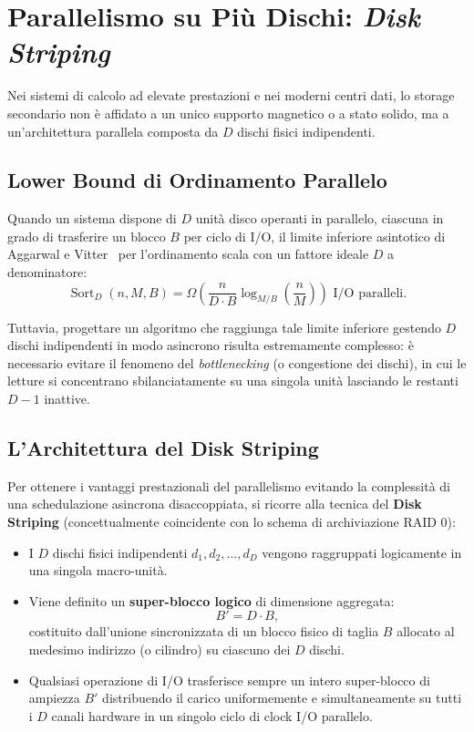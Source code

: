\section{Parallelismo su Pi\`u Dischi: \texorpdfstring{\emph{Disk Striping}}{Disk Striping}}
\label{sec:disk-striping}

Nei sistemi di calcolo ad elevate prestazioni e nei moderni centri dati, lo storage secondario non è affidato a un unico supporto magnetico o a stato solido, ma a un'architettura parallela composta da $D$ dischi fisici indipendenti.

\subsection{Lower Bound di Ordinamento Parallelo}
\label{subsec:parallel-lower-bound}

Quando un sistema dispone di $D$ unità disco operanti in parallelo, ciascuna in grado di trasferire un blocco $B$ per ciclo di I/O, il limite inferiore asintotico di Aggarwal e Vitter~\cite{aggarwal1988} per l'ordinamento scala con un fattore ideale $D$ a denominatore:
\begin{equation}
  \operatorname{Sort}_D(n, M, B) = \Omega\left(\frac{n}{D \cdot B} \log_{M/B}\left(\frac{n}{M}\right)\right) \text{ I/O paralleli}.
\end{equation}

Tuttavia, progettare un algoritmo che raggiunga tale limite inferiore gestendo $D$ dischi indipendenti in modo asincrono risulta estremamente complesso: è necessario evitare il fenomeno del \textit{bottlenecking} (o congestione dei dischi), in cui le letture si concentrano sbilanciatamente su una singola unità lasciando le restanti $D-1$ inattive.

\subsection{L'Architettura del Disk Striping}
\label{subsec:striping-architecture}

Per ottenere i vantaggi prestazionali del parallelismo evitando la complessità di una schedulazione asincrona disaccoppiata, si ricorre alla tecnica del \textbf{Disk Striping} (concettualmente coincidente con lo schema di archiviazione RAID 0):
\begin{itemize}
  \item I $D$ dischi fisici indipendenti $d_1, d_2, \dots, d_D$ vengono raggruppati logicamente in una singola macro-unità.
  \item Viene definito un \textbf{super-blocco logico} di dimensione aggregata:
  \begin{equation}
    B' = D \cdot B,
  \end{equation}
  costituito dall'unione sincronizzata di un blocco fisico di taglia $B$ allocato al medesimo indirizzo (o cilindro) su ciascuno dei $D$ dischi.
  \item Qualsiasi operazione di I/O trasferisce sempre un intero super-blocco di ampiezza $B'$ distribuendo il carico uniformemente e simultaneamente su tutti i $D$ canali hardware in un singolo ciclo di clock I/O parallelo.
\end{itemize}

